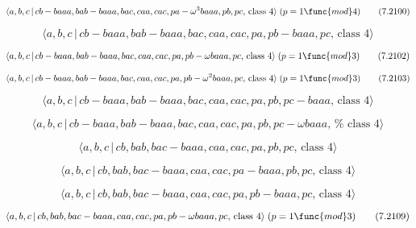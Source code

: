 \documentclass[10pt]{article}
\begin{document}
\begin{equation}
\langle a,b,c\,|\,cb-baaa,bab-baaa,bac,caa,cac,pa-\omega ^{3}baaa,pb,pc,\,%
\text{class }4\rangle \;(p=1\func{mod}4)  \tag{7.2100}
\end{equation}

\begin{equation}
\langle a,b,c\,|\,cb-baaa,bab-baaa,bac,caa,cac,pa,pb-baaa,pc,\,\text{class }%
4\rangle  \tag{7.2101}
\end{equation}

\begin{equation}
\langle a,b,c\,|\,cb-baaa,bab-baaa,bac,caa,cac,pa,pb-\omega baaa,pc,\,\text{%
class }4\rangle \;(p=1\func{mod}3)  \tag{7.2102}
\end{equation}

\begin{equation}
\langle a,b,c\,|\,cb-baaa,bab-baaa,bac,caa,cac,pa,pb-\omega ^{2}baaa,pc,\,%
\text{class }4\rangle \;(p=1\func{mod}3)  \tag{7.2103}
\end{equation}

\begin{equation}
\langle a,b,c\,|\,cb-baaa,bab-baaa,bac,caa,cac,pa,pb,pc-baaa,\,\text{class }%
4\rangle  \tag{7.2104}
\end{equation}

\begin{equation}
\langle a,b,c\,|\,cb-baaa,bab-baaa,bac,caa,cac,pa,pb,pc-\omega baaa,\,\text{%
class }4\rangle  \tag{7.2105}
\end{equation}

\begin{equation}
\langle a,b,c\,|\,cb,bab,bac-baaa,caa,cac,pa,pb,pc,\,\text{class }4\rangle 
\tag{7.2106}
\end{equation}

\begin{equation}
\langle a,b,c\,|\,cb,bab,bac-baaa,caa,cac,pa-baaa,pb,pc,\,\text{class }%
4\rangle  \tag{7.2107}
\end{equation}

\begin{equation}
\langle a,b,c\,|\,cb,bab,bac-baaa,caa,cac,pa,pb-baaa,pc,\,\text{class }%
4\rangle  \tag{7.2108}
\end{equation}

\begin{equation}
\langle a,b,c\,|\,cb,bab,bac-baaa,caa,cac,pa,pb-\omega baaa,pc,\,\text{class 
}4\rangle \;(p=1\func{mod}3)  \tag{7.2109}
\end{equation}
\end{document}

